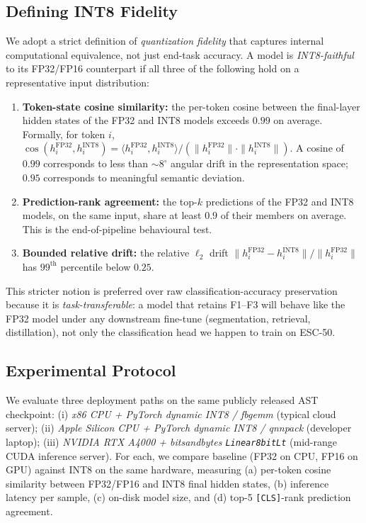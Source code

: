 \documentclass[conference]{IEEEtran}
\begin{document}
\subsection{Defining INT8 Fidelity}
\label{sec:int8-fidelity}
We adopt a strict definition of \emph{quantization fidelity} that captures internal computational equivalence, not just end-task accuracy. A model is \emph{INT8-faithful} to its FP32/FP16 counterpart if all three of the following hold on a representative input distribution:
\begin{enumerate}[leftmargin=4em,labelindent=0pt,labelsep=0.5em]
    \item[\textbf{F1}] \textbf{Token-state cosine similarity:} the per-token cosine between the final-layer hidden states of the FP32 and INT8 models exceeds $0.99$ on average. Formally, for token $i$, $\cos(h_i^{\text{FP32}}, h_i^{\text{INT8}}) = \langle h_i^{\text{FP32}}, h_i^{\text{INT8}}\rangle / (\|h_i^{\text{FP32}}\| \cdot \|h_i^{\text{INT8}}\|)$. A cosine of $0.99$ corresponds to less than $\sim 8^{\circ}$ angular drift in the representation space; $0.95$ corresponds to meaningful semantic deviation.
    \item[\textbf{F2}] \textbf{Prediction-rank agreement:} the top-$k$ predictions of the FP32 and INT8 models, on the same input, share at least $0.9$ of their members on average. This is the end-of-pipeline behavioural test.
    \item[\textbf{F3}] \textbf{Bounded relative drift:} the relative $\ell_2$ drift $\|h_i^{\text{FP32}} - h_i^{\text{INT8}}\| / \|h_i^{\text{FP32}}\|$ has $99^{\text{th}}$ percentile below $0.25$.
\end{enumerate}
This stricter notion is preferred over raw classification-accuracy preservation because it is \emph{task-transferable}: a model that retains F1--F3 will behave like the FP32 model under any downstream fine-tune (segmentation, retrieval, distillation), not only the classification head we happen to train on ESC-50.

\subsection{Experimental Protocol}
We evaluate three deployment paths on the same publicly released AST checkpoint:
(i) \emph{x86 CPU + PyTorch dynamic INT8 / fbgemm} (typical cloud server);
(ii) \emph{Apple Silicon CPU + PyTorch dynamic INT8 / qnnpack} (developer laptop);
(iii) \emph{NVIDIA RTX A4000 + bitsandbytes \texttt{Linear8bitLt}} (mid-range CUDA inference server).
For each, we compare baseline (FP32 on CPU, FP16 on GPU) against INT8 on the same hardware, measuring (a) per-token cosine similarity between FP32/FP16 and INT8 final hidden states, (b) inference latency per sample, (c) on-disk model size, and (d) top-5 \texttt{[CLS]}-rank prediction agreement.
\end{document}

